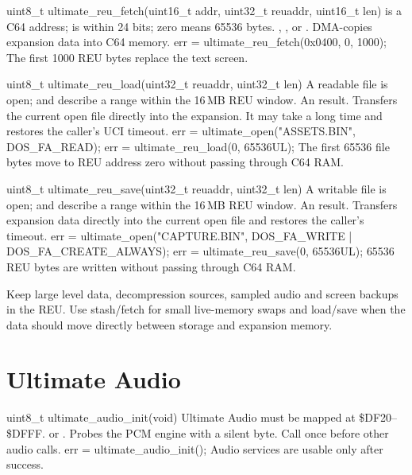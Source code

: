 \begin{referencechapter}
{uint8\_t ultimate\_reu\_fetch(uint16\_t addr, uint32\_t reuaddr, uint16\_t len)}
{ is a C64 address;  is within 24 bits; zero
 means 65536 bytes.}
{, , or
.}
{DMA-copies expansion data into C64 memory.}
{err = ultimate\_reu\_fetch(0x0400, 0, 1000);}
{The first 1000 REU bytes replace the text screen.}

{uint8\_t ultimate\_reu\_load(uint32\_t reuaddr, uint32\_t len)}
{A readable file is open;  and  describe a range within
the 16\,MB REU window.}
{An  result.}
{Transfers the current open file directly into the expansion. It may take a
long time and restores the caller's UCI timeout.}
{err = ultimate\_open("ASSETS.BIN", DOS\_FA\_READ); err = ultimate\_reu\_load(0, 65536UL);}
{The first 65536 file bytes move to REU address zero without passing through C64 RAM.}

{uint8\_t ultimate\_reu\_save(uint32\_t reuaddr, uint32\_t len)}
{A writable file is open;  and  describe a range within
the 16\,MB REU window.}
{An  result.}
{Transfers expansion data directly into the current open file and restores the
caller's timeout.}
{err = ultimate\_open("CAPTURE.BIN", DOS\_FA\_WRITE | DOS\_FA\_CREATE\_ALWAYS); err = ultimate\_reu\_save(0, 65536UL);}
{65536 REU bytes are written without passing through C64 RAM.}

\begin{tip}
Keep large level data, decompression sources, sampled audio and screen backups
in the REU. Use stash/fetch for small live-memory swaps and load/save when the
data should move directly between storage and expansion memory.
\end{tip}

\section{Ultimate Audio}

{uint8\_t ultimate\_audio\_init(void)}
{Ultimate Audio must be mapped at \$DF20--\$DFFF.}
{ or .}
{Probes the PCM engine with a silent byte. Call once before other audio calls.}
{err = ultimate\_audio\_init();}
{Audio services are usable only after success.}


\end{referencechapter}
